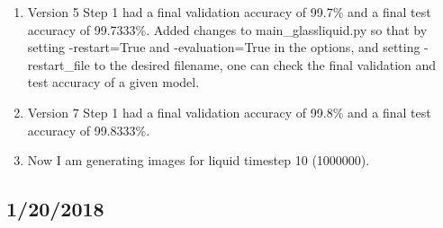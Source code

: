 \documentclass[12pt,reqno]{amsart}
\numberwithin{equation}{section}
\begin{document}
\begin{enumerate}
\item Version 5 Step 1 had a final validation accuracy of 99.7\% and a final test accuracy of 99.7333\%.  Added changes to main\_glassliquid.py so that by setting -restart=True and -evaluation=True in the options, and setting -restart\_file to the desired filename, one can check the final validation and test accuracy of a given model.    
\item Version 7 Step 1 had a final validation accuracy of 99.8\% and a final test accuracy of 99.8333\%.  

\item Now I am generating images for liquid timestep 10 (1000000).  

\end{enumerate}

\subsection{1/20/2018}
\end{document}
